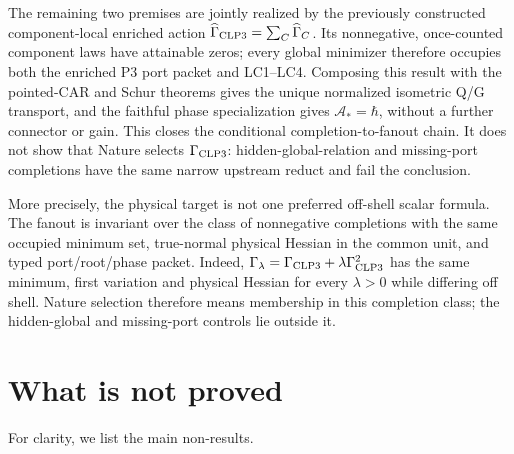 \documentclass[11pt]{article}
\begin{document}
The remaining two premises are jointly realized by the previously constructed
component-local enriched action
$\widehat\Gamma_{\rm CLP3}=\sum_C\widehat\Gamma_C$. Its nonnegative,
once-counted component laws have attainable zeros; every global minimizer
therefore occupies both the enriched P3 port packet and LC1--LC4. Composing
this result with the pointed-CAR and Schur theorems gives the unique normalized
isometric Q/G transport, and the faithful phase specialization gives
$\mathcal A_*=\hbar$, without a further connector or gain. This closes the
conditional completion-to-fanout chain. It does not show that Nature selects
$\Gamma_{\rm CLP3}$: hidden-global-relation and missing-port completions have
the same narrow upstream reduct and fail the conclusion.

More precisely, the physical target is not one preferred off-shell scalar
formula.  The fanout is invariant over the class of nonnegative completions
with the same occupied minimum set, true-normal physical Hessian in the common
unit, and typed port/root/phase packet.  Indeed,
$\Gamma_\lambda=\Gamma_{\rm CLP3}+\lambda\Gamma_{\rm CLP3}^2$ has the same
minimum, first variation and physical Hessian for every $\lambda>0$ while
differing off shell.  Nature selection therefore means membership in this
completion class; the hidden-global and missing-port controls lie outside it.

\section{What is not proved}

For clarity, we list the main non-results.
\end{document}
